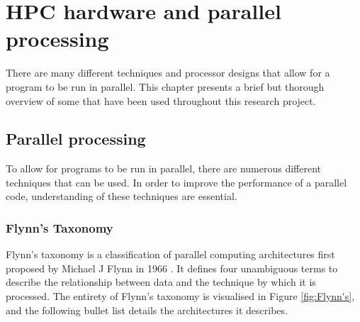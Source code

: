 \documentclass[a4paper,11pt]{report}
\begin{document}
\chapter{HPC hardware and parallel processing}
There are many different techniques and processor designs that allow for a program to be run in parallel. This chapter presents a brief but thorough overview of some that have been used throughout this research project. 

\section{Parallel processing}
To allow for programs to be run in parallel, there are numerous different techniques that can be used. In order to improve the performance of a parallel code, understanding of these techniques are essential.

\subsection{Flynn's Taxonomy}
Flynn's taxonomy is a classification of parallel computing architectures first proposed by Michael J Flynn in 1966 \cite{flynn1972some}. It defines four unambiguous terms to describe the relationship between data and the technique by which it is processed. The entirety of Flynn's taxonomy is visualised in Figure \ref{fig:Flynn's}, and the following bullet list details the architectures it describes.
\end{document}
